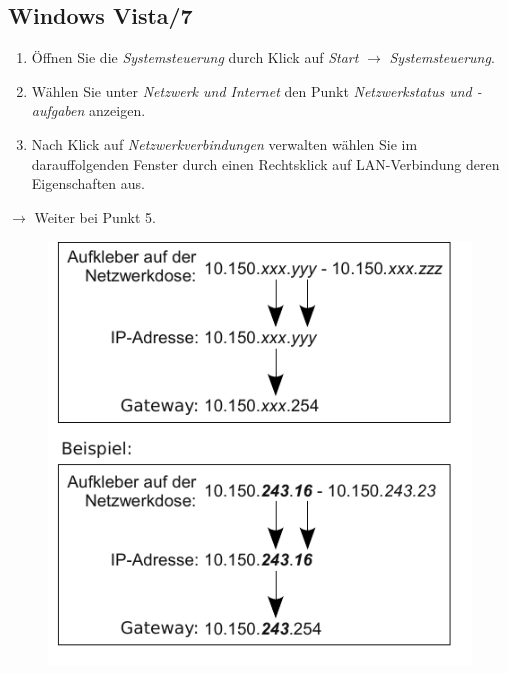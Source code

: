 \documentclass[a4paper,12pt]{scrartcl}
\begin{document}
\subsection*{Windows Vista/7}
\begin{enumerate}
    \item Öffnen Sie die \emph{Systemsteuerung} durch Klick auf \emph{Start} $\rightarrow$ \emph{Systemsteuerung}.
    \item Wählen Sie unter \emph{Netzwerk und Internet} den Punkt \emph{Netzwerkstatus und -aufgaben} anzeigen.
    \item Nach Klick auf \emph{Netzwerkverbindungen} verwalten wählen Sie im darauffolgenden Fenster durch einen Rechtsklick auf LAN-Verbindung deren Eigenschaften aus.
\end{enumerate}
$\rightarrow$ Weiter bei Punkt 5.
      \begin{figure}[h!]
	\centering
        \vspace{-5pt}
        \begin{minipage}[c]{0.45\linewidth}
          \centering
          \includegraphics[width=\linewidth,keepaspectratio]{Bilder/IP_Gerneric}
        \end{minipage}
        \begin{minipage}[c]{0.48\linewidth}
          \centering

\end{minipage}
\end{figure}
\end{document}

